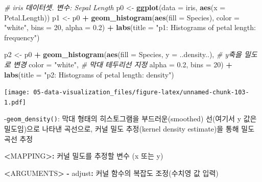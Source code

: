 \documentclass[
  11pt,
]{krantz}
\newenvironment{Shaded}{\begin{snugshade}}{\end{snugshade}}
\newcommand{\CommentTok}[1]{\textcolor[rgb]{0.37,0.37,0.37}{\textit{#1}}}
\newcommand{\DataTypeTok}[1]{\textcolor[rgb]{0.27,0.27,0.27}{#1}}
\newcommand{\DecValTok}[1]{\textcolor[rgb]{0.06,0.06,0.06}{#1}}
\newcommand{\ErrorTok}[1]{\textcolor[rgb]{0.14,0.14,0.14}{\textbf{#1}}}
\newcommand{\FloatTok}[1]{\textcolor[rgb]{0.06,0.06,0.06}{#1}}
\newcommand{\KeywordTok}[1]{\textcolor[rgb]{0.27,0.27,0.27}{\textbf{#1}}}
\newcommand{\NormalTok}[1]{#1}
\newcommand{\OperatorTok}[1]{\textcolor[rgb]{0.43,0.43,0.43}{\textbf{#1}}}
\newcommand{\StringTok}[1]{\textcolor[rgb]{0.5,0.5,0.5}{#1}}
\begin{document}
\begin{Shaded}
\begin{Highlighting}[]
\CommentTok{# iris 데이터셋. 변수: Sepal Length}
\NormalTok{p0 <-}\StringTok{ }\KeywordTok{ggplot}\NormalTok{(}\DataTypeTok{data =}\NormalTok{ iris, }\KeywordTok{aes}\NormalTok{(}\DataTypeTok{x =}\NormalTok{ Petal.Length))}
\NormalTok{p1 <-}\StringTok{ }\NormalTok{p0 }\OperatorTok{+}\StringTok{ }
\StringTok{  }\KeywordTok{geom_histogram}\NormalTok{(}\KeywordTok{aes}\NormalTok{(}\DataTypeTok{fill =}\NormalTok{ Species), }
                 \DataTypeTok{color =} \StringTok{"white"}\NormalTok{,}
                 \DataTypeTok{bins =} \DecValTok{20}\NormalTok{, }
                 \DataTypeTok{alpha =} \FloatTok{0.2}\NormalTok{) }\OperatorTok{+}\StringTok{ }
\StringTok{  }\KeywordTok{labs}\NormalTok{(}\DataTypeTok{title =} \StringTok{"p1: Histograms of petal length: frequency"}\NormalTok{)}

\NormalTok{p2 <-}\StringTok{ }\NormalTok{p0 }\OperatorTok{+}\StringTok{ }
\StringTok{  }\KeywordTok{geom_histogram}\NormalTok{(}\KeywordTok{aes}\NormalTok{(}\DataTypeTok{fill =}\NormalTok{ Species, }
                     \DataTypeTok{y =}\NormalTok{ ..density..), }\CommentTok{# y축을 밀도로 변경}
                 \DataTypeTok{color =} \StringTok{"white"}\NormalTok{, }\CommentTok{# 막대 테두리선 지정}
                 \DataTypeTok{alpha =} \FloatTok{0.2}\NormalTok{, }
                 \DataTypeTok{bins =} \DecValTok{20}\NormalTok{) }\OperatorTok{+}\StringTok{  }
\StringTok{  }\KeywordTok{labs}\NormalTok{(}\DataTypeTok{title =} \StringTok{"p2: Histograms of petal length: density"}\NormalTok{)}
\end{Highlighting}
\end{Shaded}

\normalsize

\footnotesize

\texttt{[image: 05-data-visualization\_files/figure-latex/unnamed-chunk-103-1.pdf]}

\normalsize

-\texttt{geom\_density()}: 막대 형태의 히스토그램을 부드러운(smoothed) 선(여기서 y 값은 밀도임)으로 나타낸 곡선으로, 커널 밀도 추정(kernel density estimate)을 통해 밀도 곡선 추정

\footnotesize

\begin{Shaded}
\begin{Highlighting}[]
\OperatorTok{<}\NormalTok{MAPPING}\OperatorTok{>}\ErrorTok{:}\StringTok{ }\NormalTok{커널 밀도를 추정할 변수 (x 또는 y)}

\OperatorTok{<}\NormalTok{ARGUMENTS}\OperatorTok{>}
\StringTok{   }\OperatorTok{-}\StringTok{ }\NormalTok{adjust}\OperatorTok{:}\StringTok{ }\NormalTok{커널 함수의 복잡도 조정(수치영 값 입력)}
\end{Highlighting}
\end{Shaded}
\end{document}
